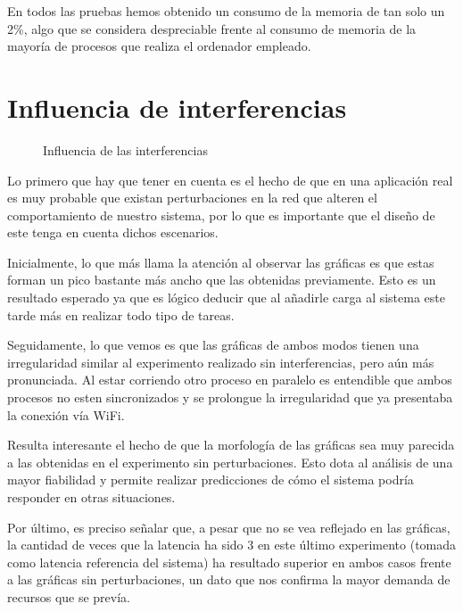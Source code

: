 \documentclass[a4paper,11pt,spanish]{sphinxmanual}
\let\sphinxpxdimen\pdfpxdimen\else\newdimen\sphinxpxdimen
\begin{document}
\sphinxAtStartPar
En todos las pruebas hemos obtenido un consumo de la memoria de tan solo un 2\%, algo
que se considera despreciable frente al consumo de memoria de la mayoría de procesos que
realiza el ordenador empleado.


\section{Influencia de interferencias}
\label{\detokenize{resultados:influencia-de-interferencias}}
\begin{figure}[htbp]
\centering
\capstart

\noindent\sphinxincludegraphics[width=650\sphinxpxdimen]{{interferencias}.png}
\caption{Influencia de las interferencias}\label{\detokenize{resultados:id5}}\end{figure}

\sphinxAtStartPar
Lo primero que hay que tener en cuenta es el hecho de que en una aplicación
real es muy probable que existan perturbaciones en la red que alteren el
comportamiento de nuestro sistema, por lo que es importante que el diseño de este
tenga en cuenta dichos escenarios.

\sphinxAtStartPar
Inicialmente, lo que más llama la atención al observar las gráficas es que estas forman
un pico bastante más ancho que las obtenidas previamente. Esto es un resultado
esperado ya que es lógico deducir que al añadirle carga al sistema este tarde más
en realizar todo tipo de tareas.

\sphinxAtStartPar
Seguidamente, lo que vemos es que las gráficas de ambos modos tienen una irregularidad
similar al experimento realizado sin interferencias, pero aún más pronunciada.
Al estar corriendo otro proceso en paralelo es entendible que ambos procesos no esten
sincronizados y se prolongue la irregularidad que ya presentaba la conexión vía Wi\sphinxhyphen{}Fi.

\sphinxAtStartPar
Resulta interesante el hecho de que la morfología de las gráficas sea muy parecida a las obtenidas
en el experimento sin perturbaciones. Esto dota al análisis de una mayor fiabilidad y permite
realizar predicciones de cómo el sistema podría responder en otras situaciones.

\sphinxAtStartPar
Por último, es preciso señalar que, a pesar que no se vea reflejado en las gráficas, la cantidad
de veces que la latencia ha sido 3 en este último experimento (tomada como latencia
referencia del sistema) ha resultado superior en ambos casos frente a las gráficas
sin perturbaciones, un dato que nos confirma la mayor demanda de recursos que se
prevía.
\end{document}
